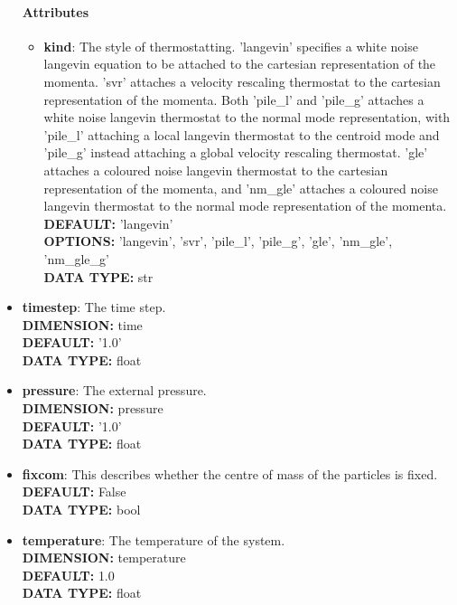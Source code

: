 \begin{itemize}
\paragraph{Attributes}
 \begin{itemize}
\item {\bf kind}:
 The style of thermostatting. 'langevin' specifies a white noise langevin equation to be attached to the cartesian representation of the momenta. 'svr' attaches a velocity rescaling thermostat to the cartesian representation of the momenta. Both 'pile\_l' and 'pile\_g' attaches a white noise langevin thermostat to the normal mode representation, with 'pile\_l' attaching a local langevin thermostat to the centroid mode and 'pile\_g' instead attaching a global velocity rescaling thermostat. 'gle' attaches a coloured noise langevin thermostat to the cartesian representation of the momenta, and 'nm\_gle' attaches a coloured noise langevin thermostat to the normal mode representation of the momenta.
{\\ \bf DEFAULT: }'langevin'
{\\ \bf OPTIONS: }'langevin', 'svr', 'pile\_l', 'pile\_g', 'gle', 'nm\_gle', 'nm\_gle\_g'
{\\ \bf DATA TYPE: }str
\end{itemize}
 
\item {\bf timestep}:
 The time step.
{\\ \bf DIMENSION: }time
{\\ \bf DEFAULT: }'1.0'
{\\ \bf DATA TYPE: }float
\item {\bf pressure}:
 The external pressure.
{\\ \bf DIMENSION: }pressure
{\\ \bf DEFAULT: }'1.0'
{\\ \bf DATA TYPE: }float
\item {\bf fixcom}:
 This describes whether the centre of mass of the particles is fixed.
{\\ \bf DEFAULT: }False
{\\ \bf DATA TYPE: }bool
\item {\bf temperature}:
 The temperature of the system.
{\\ \bf DIMENSION: }temperature
{\\ \bf DEFAULT: }1.0
{\\ \bf DATA TYPE: }float
\end{itemize}
 
